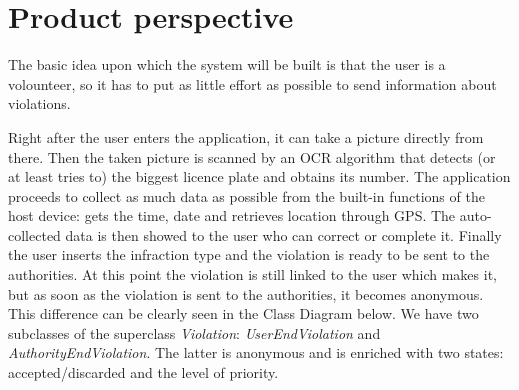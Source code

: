 \section{Product perspective}
The basic idea upon which the system will be built is that the user is a volounteer, so it has to put as little effort as possible to send information about violations.

Right after the user enters the application, it can take a picture directly from there. Then the taken picture is scanned by an OCR algorithm that detects (or at least tries to) the biggest licence plate and obtains its number. The application proceeds to collect as much data as possible from the built-in functions of the host device: gets the time, date and retrieves location through GPS. The auto-collected data is then showed to the user who can correct or complete it.
Finally the user inserts the infraction type and the violation is ready to be sent to the authorities. At this point the violation is still linked to the user which makes it, but as soon as the violation is sent to the authorities, it becomes anonymous. This difference can be clearly seen in the Class Diagram below. We have two subclasses of the superclass \emph{Violation}: \emph{UserEndViolation} and \emph{AuthorityEndViolation}. The latter is anonymous and is enriched with two states: accepted/discarded and the level of priority.

